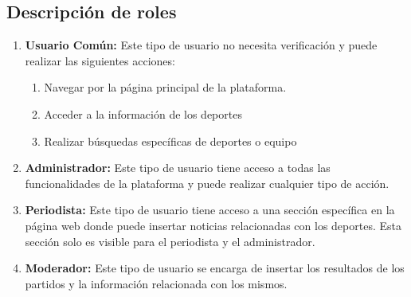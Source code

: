 \documentclass{article} %
\begin{document}
    \subsection{Descripción de roles}
    \begin{enumerate}
        \item \textbf{Usuario Común:} Este tipo de usuario no necesita verificación y puede realizar las siguientes
    acciones:
 \begin{enumerate}
     \item  Navegar por la página principal de la plataforma.
     \item Acceder a la información de los deportes
     \item Realizar búsquedas específicas de deportes o equipo
 \end{enumerate}
\item \textbf{Administrador:} Este tipo de usuario tiene acceso a todas las funcionalidades de la plataforma y
puede realizar cualquier tipo de acción.
\item \textbf{Periodista: }Este tipo de usuario tiene acceso a una sección específica en la página web donde
puede insertar noticias relacionadas con los deportes. Esta sección solo es visible para el periodista
y el administrador.
\item \textbf{Moderador:}  Este tipo de usuario se encarga de insertar los resultados de los partidos y la información relacionada con los mismos.



    \end{enumerate}
\end{document}
